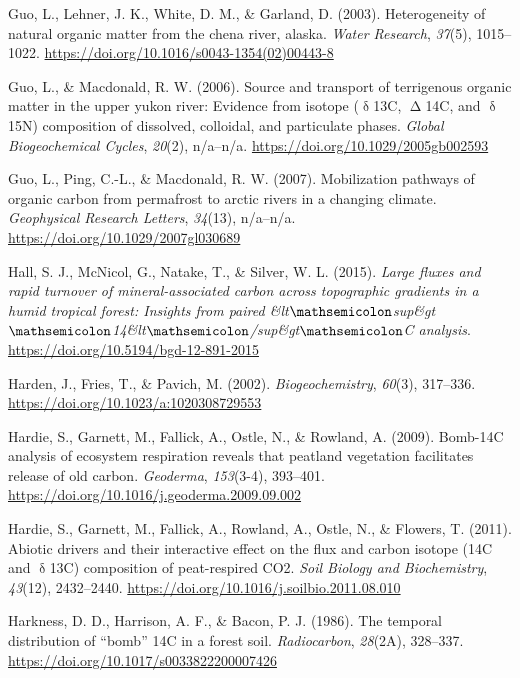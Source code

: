 \documentclass[]{article}
\begin{document}
\leavevmode\hypertarget{ref-Guo_2003}{}%
Guo, L., Lehner, J. K., White, D. M., \& Garland, D. (2003).
Heterogeneity of natural organic matter from the chena river, alaska.
\emph{Water Research}, \emph{37}(5), 1015--1022.
\url{https://doi.org/10.1016/s0043-1354(02)00443-8}

\leavevmode\hypertarget{ref-Guo_2006}{}%
Guo, L., \& Macdonald, R. W. (2006). Source and transport of terrigenous
organic matter in the upper yukon river: Evidence from isotope
(\(\updelta\)13C, \(\upDelta\)14C, and \(\updelta\)15N) composition of
dissolved, colloidal, and particulate phases. \emph{Global
Biogeochemical Cycles}, \emph{20}(2), n/a--n/a.
\url{https://doi.org/10.1029/2005gb002593}

\leavevmode\hypertarget{ref-Guo_2007}{}%
Guo, L., Ping, C.-L., \& Macdonald, R. W. (2007). Mobilization pathways
of organic carbon from permafrost to arctic rivers in a changing
climate. \emph{Geophysical Research Letters}, \emph{34}(13), n/a--n/a.
\url{https://doi.org/10.1029/2007gl030689}

\leavevmode\hypertarget{ref-Hall_2015}{}%
Hall, S. J., McNicol, G., Natake, T., \& Silver, W. L. (2015).
\emph{Large fluxes and rapid turnover of mineral-associated carbon
across topographic gradients in a humid tropical forest: Insights from
paired
\&lt\(\mathsemicolon\)sup\&gt\(\mathsemicolon\)14\&lt\(\mathsemicolon\)/sup\&gt\(\mathsemicolon\)C
analysis}. \url{https://doi.org/10.5194/bgd-12-891-2015}

\leavevmode\hypertarget{ref-Harden_2002}{}%
Harden, J., Fries, T., \& Pavich, M. (2002). \emph{Biogeochemistry},
\emph{60}(3), 317--336. \url{https://doi.org/10.1023/a:1020308729553}

\leavevmode\hypertarget{ref-Hardie_2009}{}%
Hardie, S., Garnett, M., Fallick, A., Ostle, N., \& Rowland, A. (2009).
Bomb-14C analysis of ecosystem respiration reveals that peatland
vegetation facilitates release of old carbon. \emph{Geoderma},
\emph{153}(3-4), 393--401.
\url{https://doi.org/10.1016/j.geoderma.2009.09.002}

\leavevmode\hypertarget{ref-Hardie_2011}{}%
Hardie, S., Garnett, M., Fallick, A., Rowland, A., Ostle, N., \&
Flowers, T. (2011). Abiotic drivers and their interactive effect on the
flux and carbon isotope (14C and \(\updelta\)13C) composition of
peat-respired CO2. \emph{Soil Biology and Biochemistry}, \emph{43}(12),
2432--2440. \url{https://doi.org/10.1016/j.soilbio.2011.08.010}

\leavevmode\hypertarget{ref-Harkness_1986}{}%
Harkness, D. D., Harrison, A. F., \& Bacon, P. J. (1986). The temporal
distribution of ``bomb'' 14C in a forest soil. \emph{Radiocarbon},
\emph{28}(2A), 328--337. \url{https://doi.org/10.1017/s0033822200007426}
\end{document}
